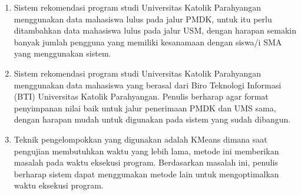 \begin{enumerate}
    \item Sistem rekomendasi program studi Universitas Katolik Parahyangan menggunakan data mahasiswa lulus pada jalur PMDK, untuk itu perlu ditambahkan data mahasiswa lulus pada jalur USM, dengan harapan semakin banyak jumlah pengguna yang memiliki kesanamaan dengan siswa/i SMA yang menggunakan sistem.
    
    \item Sistem rekomendasi program studi Universitas Katolik Parahyangan menggunakan data mahasiswa yang berasal dari Biro Teknologi Informasi (BTI) Universitas Katolik Parahyangan. Penulis berharap agar format penyimpanan nilai baik untuk jalur penerimaan PMDK dan UMS sama, dengan harapan mudah untuk digunakan pada sistem yang sudah dibangun.
    
    \item Teknik pengelompokkan yang digunakan adalah KMeans dimana saat pengujian membutuhkan waktu yang lebih lama, metode ini memberikan masalah pada waktu eksekusi program. Berdasarkan masalah ini, penulis berharap sistem dapat menggunakan metode lain untuk mengoptimalkan waktu eksekusi program.
\end{enumerate}